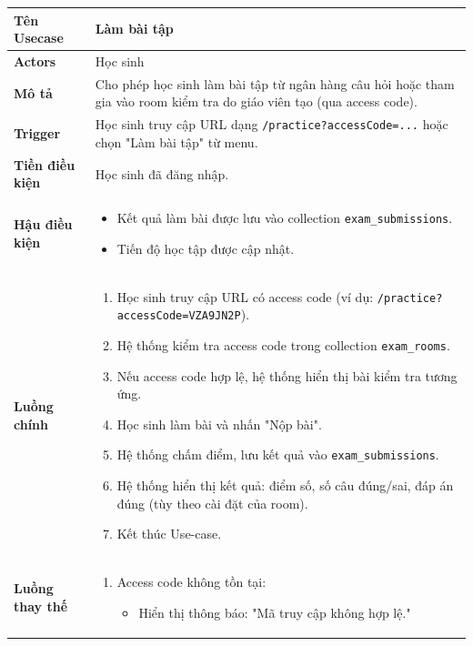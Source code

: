 \begin{longtable}{|p{}|p{}|}
\hline
\textbf{Tên Usecase} & \textbf{Làm bài tập} \\
\hline
\textbf{Actors} & Học sinh \\
\hline
\textbf{Mô tả} & 
Cho phép học sinh làm bài tập từ ngân hàng câu hỏi hoặc tham gia vào room kiểm tra do giáo viên tạo (qua access code). \\
\hline
\textbf{Trigger} & Học sinh truy cập URL dạng \texttt{/practice?accessCode=...} hoặc chọn "Làm bài tập" từ menu. \\
\hline
\textbf{Tiền điều kiện} & Học sinh đã đăng nhập. \\
\hline
\textbf{Hậu điều kiện} & 
\vspace{-\baselineskip}
\begin{itemize}[topsep=2pt, itemsep=0pt]
    \item Kết quả làm bài được lưu vào collection \texttt{exam\_submissions}.
    \item Tiến độ học tập được cập nhật.
\end{itemize} \\
\hline
\textbf{Luồng chính} &
\vspace{-\baselineskip}
\begin{enumerate}[topsep=2pt, itemsep=0pt]
    \item Học sinh truy cập URL có access code (ví dụ: \texttt{/practice?accessCode=VZA9JN2P}).
    \item Hệ thống kiểm tra access code trong collection \texttt{exam\_rooms}.
    \item Nếu access code hợp lệ, hệ thống hiển thị bài kiểm tra tương ứng.
    \item Học sinh làm bài và nhấn "Nộp bài".
    \item Hệ thống chấm điểm, lưu kết quả vào \texttt{exam\_submissions}.
    \item Hệ thống hiển thị kết quả: điểm số, số câu đúng/sai, đáp án đúng (tùy theo cài đặt của room).
    \item Kết thúc Use-case.
\end{enumerate} \\
\hline
\textbf{Luồng thay thế} &
\vspace{-\baselineskip}
\begin{enumerate}[topsep=2pt, itemsep=0pt]
    \item[2a.] Access code không tồn tại:
    \begin{itemize}[topsep=0pt, itemsep=0pt]
        \item Hiển thị thông báo: "Mã truy cập không hợp lệ."

\end{itemize}
\end{enumerate}
\end{longtable}
